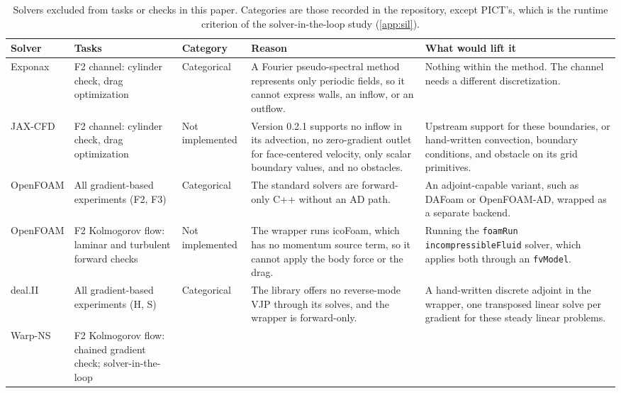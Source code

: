 \begin{table}[h]
  \centering\small
  \caption{Solvers excluded from tasks or checks in this paper. Categories
    are those recorded in the repository, except PICT's, which is the
    runtime criterion of the solver-in-the-loop study (\cref{app:sil}).}
  \label{tab:app:exclusions}
  \renewcommand{\arraystretch}{1.15}
  \begin{tabularx}{\linewidth}{@{}>{\raggedright}p{1.75cm}>{\raggedright}p{2.15cm}>{\raggedright}p{1.7cm}>{\raggedright}X>{\raggedright\arraybackslash}X@{}}
    \toprule
    \textbf{Solver} & \textbf{Tasks} & \textbf{Category} & \textbf{Reason}
      & \textbf{What would lift it} \\
    \midrule
    Exponax & F2 channel: cylinder check, drag optimization & Categorical
      & A Fourier pseudo-spectral method represents only periodic fields, so
        it cannot express walls, an inflow, or an outflow.
      & Nothing within the method. The channel needs a different
        discretization. \\
    JAX-CFD & F2 channel: cylinder check, drag optimization & Not implemented
      & Version 0.2.1 supports no inflow in its advection, no zero-gradient
        outlet for face-centered velocity, only scalar boundary values, and
        no obstacles.
      & Upstream support for these boundaries, or hand-written convection,
        boundary conditions, and obstacle on its grid primitives. \\
    OpenFOAM & All gradient-based experiments (F2, F3) & Categorical
      & The standard solvers are forward-only C++ without an AD path.
      & An adjoint-capable variant, such as DAFoam or OpenFOAM-AD, wrapped as
        a separate backend. \\
    OpenFOAM & F2 Kolmogorov flow: laminar and turbulent forward checks
      & Not implemented
      & The wrapper runs icoFoam, which has no momentum source term, so it
        cannot apply the body force or the drag.
      & Running the \texttt{foamRun} \texttt{incompressibleFluid} solver, which
        applies both through an \texttt{fvModel}. \\
    deal.II & All gradient-based experiments (H, S) & Categorical
      & The library offers no reverse-mode VJP through its solves, and the
        wrapper is forward-only.
      & A hand-written discrete adjoint in the wrapper, one transposed linear
        solve per gradient for these steady linear problems. \\
    Warp-NS & F2 Kolmogorov flow: chained gradient check; solver-in-the-loop

\end{tabularx}
\end{table}
